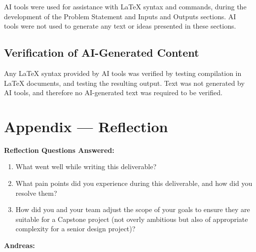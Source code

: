 \documentclass{article}
\begin{document}
AI tools were used for assistance with LaTeX syntax and commands, during the 
development of the Problem Statement and Inputs and Outputs sections. AI tools 
were not used to generate 
any text or ideas presented in these sections.

\subsection{Verification of AI-Generated Content}

Any LaTeX syntax provided by AI tools was verified by testing compilation in 
LaTeX documents, and testing the resulting output. Text was not generated by AI 
tools, and therefore no AI-generated text was required to be verified.

\newpage{}

\section*{Appendix --- Reflection}

\noindent \textbf{Reflection Questions Answered:}

\begin{enumerate}
    \item What went well while writing this deliverable?
    \item What pain points did you experience during this deliverable, and how
    did you resolve them?
    \item How did you and your team adjust the scope of your goals to ensure
    they are suitable for a Capstone project (not overly ambitious but also of
    appropriate complexity for a senior design project)?
\end{enumerate}

\noindent \textbf{Andreas:}
\end{document}
